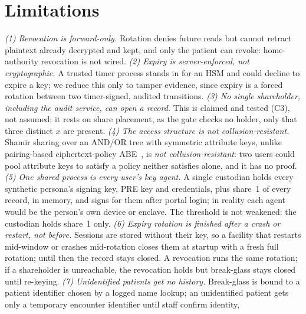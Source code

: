 \section{Limitations}\label{sec:limits}

\textit{(1) Revocation is forward-only.} Rotation denies future reads but
cannot retract plaintext already decrypted and kept, and only the patient
can revoke: home-authority revocation is not
wired. %
\textit{(2) Expiry is server-enforced, not cryptographic.} A trusted timer
process stands in for an HSM and could decline to expire a key; we reduce
this only to tamper evidence, since expiry is a forced rotation between two
timer-signed, audited transitions. %
\textit{(3) No single shareholder, including the audit service, can open a
record.} This is claimed and tested (C3), not assumed; it rests on share
placement, as the gate checks no holder, only that three distinct
$x$ are present. %
\textit{(4) The access structure is not collusion-resistant.} Shamir sharing
over an AND/OR tree with symmetric attribute keys, unlike pairing-based
ciphertext-policy ABE~\cite{bethencourt2007cpabe}, is \emph{not
collusion-resistant}: two users could pool attribute keys to satisfy a
policy neither satisfies alone, and it has no proof. %
\textit{(5) One shared process is every user's key agent.} A single
custodian holds every synthetic persona's signing key, PRE key and
credentials, plus share~1 of every record, in memory, and signs for them
after portal login; in reality each agent would be the person's own device or
enclave. %
The threshold is not weakened: the custodian holds share~1 only. %
\textit{(6) Expiry rotation is finished after a crash or restart, not
before.} Sessions are stored without their key, so a facility that restarts
mid-window or crashes mid-rotation closes them at startup with a fresh full
rotation; until then the record stays closed. %
A revocation runs the same rotation; if a shareholder is unreachable, the
revocation holds but break-glass stays closed until
re-keying. %
\textit{(7) Unidentified patients get no history.} Break-glass is bound to a
patient identifier chosen by a logged name lookup; an unidentified patient
gets only a temporary encounter identifier until staff confirm identity,
